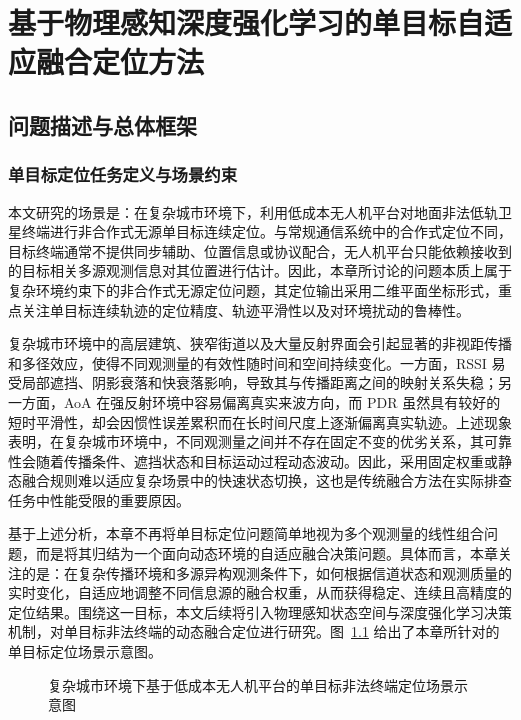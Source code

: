 \chapter{基于物理感知深度强化学习的单目标自适应融合定位方法}
\label{ch:single_target_fusion}

\section{问题描述与总体框架}
\label{sec:3_1}

\subsection{单目标定位任务定义与场景约束}
\label{subsec:3_1_1}

本文研究的场景是：在复杂城市环境下，利用低成本无人机平台对地面非法低轨卫星终端进行非合作式无源单目标连续定位。与常规通信系统中的合作式定位不同，目标终端通常不提供同步辅助、位置信息或协议配合，无人机平台只能依赖接收到的目标相关多源观测信息对其位置进行估计。因此，本章所讨论的问题本质上属于复杂环境约束下的非合作式无源定位问题，其定位输出采用二维平面坐标形式，重点关注单目标连续轨迹的定位精度、轨迹平滑性以及对环境扰动的鲁棒性。

复杂城市环境中的高层建筑、狭窄街道以及大量反射界面会引起显著的非视距传播和多径效应，使得不同观测量的有效性随时间和空间持续变化。一方面，RSSI 易受局部遮挡、阴影衰落和快衰落影响，导致其与传播距离之间的映射关系失稳；另一方面，AoA 在强反射环境中容易偏离真实来波方向，而 PDR 虽然具有较好的短时平滑性，却会因惯性误差累积而在长时间尺度上逐渐偏离真实轨迹。上述现象表明，在复杂城市环境中，不同观测量之间并不存在固定不变的优劣关系，其可靠性会随着传播条件、遮挡状态和目标运动过程动态波动。因此，采用固定权重或静态融合规则难以适应复杂场景中的快速状态切换，这也是传统融合方法在实际排查任务中性能受限的重要原因。

基于上述分析，本章不再将单目标定位问题简单地视为多个观测量的线性组合问题，而是将其归结为一个面向动态环境的自适应融合决策问题。具体而言，本章关注的是：在复杂传播环境和多源异构观测条件下，如何根据信道状态和观测质量的实时变化，自适应地调整不同信息源的融合权重，从而获得稳定、连续且高精度的定位结果。围绕这一目标，本文后续将引入物理感知状态空间与深度强化学习决策机制，对单目标非法终端的动态融合定位进行研究。图~\ref{fig:single_target_scenario} 给出了本章所针对的单目标定位场景示意图。

\begin{figure}[htbp]
    \centering
    \vspace{4.2cm}
    \caption{复杂城市环境下基于低成本无人机平台的单目标非法终端定位场景示意图}
    \label{fig:single_target_scenario}
\end{figure}

